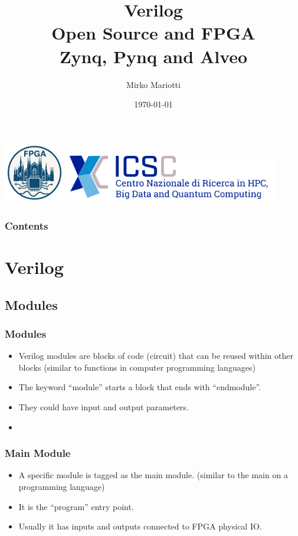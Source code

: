 \documentclass{beamer}
\begin{document}
\title[\today]{Verilog\\Open Source and FPGA\\Zynq, Pynq and Alveo}
\author{Mirko Mariotti}
\date{\today}

\begin{frame}
{
    \includegraphics[width=0.2\textwidth]{mi.png}  
    \hfill
    \includegraphics[width=0.7\textwidth]{iscs.png}
}
\titlepage
\end{frame}

\begin{frame}\frametitle{Contents}
\fontsize{6}{7.2}\selectfont
\tableofcontents
\end{frame} 

\section{Verilog}

\subsection{Modules}

\begin{frame}\frametitle{Modules}
\begin{itemize}
	\item<1-> Verilog modules are blocks of code (circuit) that can be reused within other blocks (similar to functions in computer programming languages)
	\item<2-> The keyword ``module'' starts a block that ends with ``endmodule''.
	\item<3-> They could have input and output parameters.
	\item<3-> 
\end{itemize}
\end{frame}

\begin{frame}\frametitle{Main Module}
\begin{itemize}
	\item<1-> A specific module is tagged as the main module. (similar to the main on a programming language)
	\vspace{0.5cm}
	\item<2-> It is the ``program'' entry point.
	\vspace{0.5cm}
	\item<3-> Usually it has inputs and outputs connected to FPGA physical IO.
\end{itemize}
\end{frame}
\end{document}
